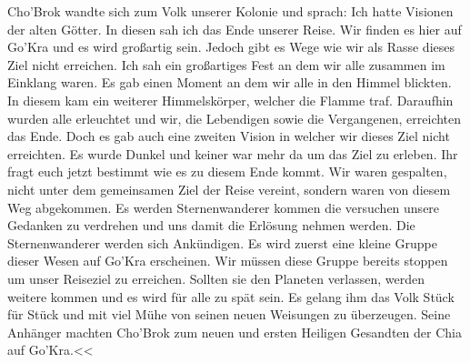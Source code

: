 \documentclass[12pt]{article}
\begin{document}
Cho'Brok wandte sich zum Volk unserer Kolonie und sprach:
\glqq Ich hatte Visionen der alten Götter. In diesen sah ich das Ende unserer Reise. Wir finden es hier auf Go'Kra und es wird großartig sein. Jedoch gibt es Wege wie wir als Rasse dieses Ziel nicht erreichen. Ich sah ein großartiges Fest an dem wir alle zusammen im Einklang waren. Es gab einen Moment an dem wir alle in den Himmel blickten. In diesem kam ein weiterer Himmelskörper, welcher die Flamme traf. Daraufhin wurden alle erleuchtet und wir, die Lebendigen sowie die Vergangenen, erreichten das Ende. Doch es gab auch eine zweiten Vision in welcher wir dieses Ziel nicht erreichten. Es wurde Dunkel und keiner war mehr da um das Ziel zu erleben. Ihr fragt euch jetzt bestimmt wie es zu diesem Ende kommt. Wir waren gespalten, nicht unter dem gemeinsamen Ziel der Reise vereint, sondern waren von diesem Weg abgekommen. Es werden Sternenwanderer kommen die versuchen unsere Gedanken zu verdrehen und uns damit die Erlösung nehmen werden. Die Sternenwanderer werden sich Ankündigen. Es wird zuerst eine kleine Gruppe dieser Wesen auf Go'Kra erscheinen. Wir müssen diese Gruppe bereits stoppen um unser Reiseziel zu erreichen. Sollten sie den Planeten verlassen, werden weitere kommen und es wird für alle zu spät sein.\grqq{} 
Es gelang ihm das Volk Stück für Stück und mit viel Mühe von seinen neuen Weisungen zu überzeugen. Seine Anhänger machten Cho'Brok zum neuen und ersten Heiligen Gesandten der Chia auf Go'Kra.<<
\end{document}
